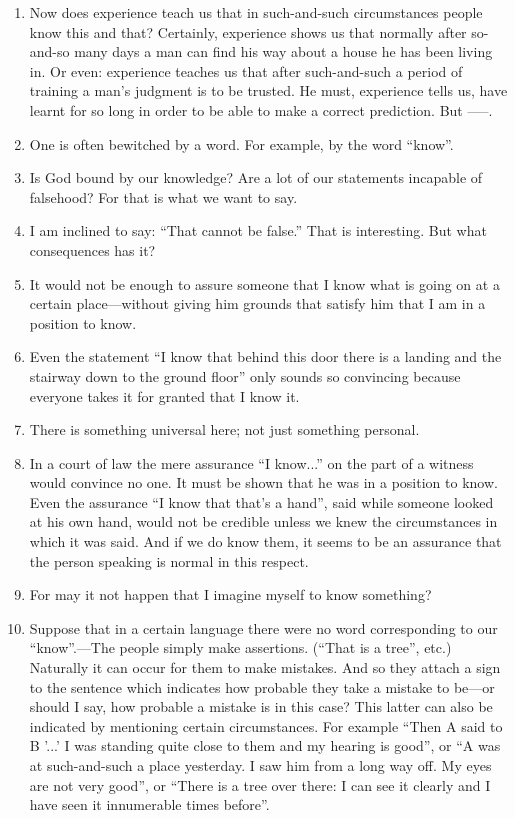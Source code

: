 \documentclass{book}
\begin{document}
\begin{enumerate}
\item
Now does experience teach us that in such-and-such circumstances people know
this and that? Certainly, experience shows us that normally after so-and-so
many days a man can find his way about a house he has been living in. Or even:
experience teaches us that after such-and-such a period of training a man's
judgment is to be trusted. He must, experience tells us, have learnt for so
long in order to be able to make a correct prediction. But -----.

\item
One is often bewitched by a word. For example, by the word ``know''.

\item
Is God bound by our knowledge? Are a lot of our statements incapable of
falsehood? For that is what we want to say.

\item
I am inclined to say: ``That cannot be false.'' That is interesting. But what
consequences has it?

\item
It would not be enough to assure someone that I know what is going on at a
certain place---without giving him grounds that satisfy him that I am in a
position to know.

\item
Even the statement ``I know that behind this door there is a landing and the
stairway down to the ground floor'' only sounds so convincing because everyone
takes it for granted that I know it.

\item
There is something universal here; not just something personal.

\item
In a court of law the mere assurance ``I know...'' on the part of a witness
would convince no one. It must be shown that he was in a position to know.
Even the assurance ``I know that that's a hand'', said while someone looked at
his own hand, would not be credible unless we knew the circumstances in which
it was said. And if we do know them, it seems to be an assurance that the
person speaking is normal in this respect.

\item
For may it not happen that I imagine myself to know something?

\item
Suppose that in a certain language there were no word corresponding to our
``know''.---The people simply make assertions. (``That is a tree'', etc.)
Naturally it can occur for them to make mistakes. And so they attach a sign to
the sentence which indicates how probable they take a mistake to be---or should
I say, how probable a mistake is in this case? This latter can also be
indicated by mentioning certain circumstances. For example ``Then A said to B
'...' I was standing quite close to them and my hearing is good'', or ``A was
at such-and-such a place yesterday. I saw him from a long way off. My eyes are
not very good'', or ``There is a tree over there: I can see it clearly and I
have seen it innumerable times before''.


\end{enumerate}
\end{document}

